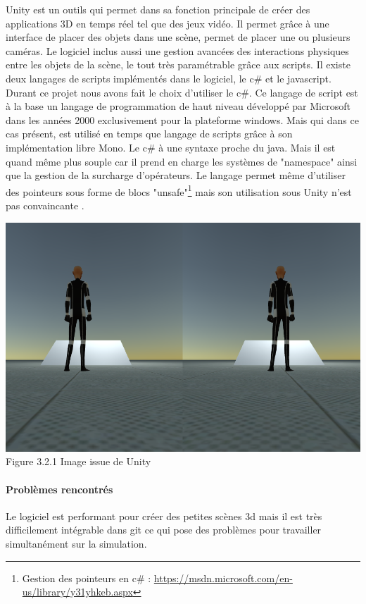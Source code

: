 \documentclass[12pt,a4paper]{report}
\begin{document}
Unity est un outils qui permet dans sa fonction principale de créer des applications 3D en temps réel tel que des jeux vidéo. Il permet grâce à une interface de placer des objets dans une scène, permet de placer une ou plusieurs caméras. Le logiciel inclus aussi une gestion avancées des interactions physiques entre les objets de la scène, le tout très paramétrable grâce aux scripts. Il existe deux langages de scripts implémentés dans le logiciel, le c\# et le javascript. Durant ce projet nous avons fait le choix d'utiliser le c\#.
Ce langage de script est à la base un langage de programmation de haut niveau développé par Microsoft dans les années 2000 exclusivement pour la plateforme windows. Mais qui dans ce cas présent, est utilisé en temps que langage de scripts grâce à son implémentation libre Mono. Le c\# à une syntaxe proche du java. Mais il est quand même plus souple car il prend en charge les systèmes de "namespace" ainsi que la gestion de la surcharge d'opérateurs. Le langage permet même d'utiliser des pointeurs sous forme de blocs "unsafe"\footnote{Gestion des pointeurs en c\# : \url{https://msdn.microsoft.com/en-us/library/y31yhkeb.aspx}} mais son utilisation sous Unity n'est pas convaincante .

	\begin{center}
		\includegraphics[scale=0.5]{Screenshot_skybox.png}
		Figure 3.2.1 Image issue de Unity\\
	\end{center}
 	
\paragraph{Problèmes rencontrés}
Le logiciel est performant pour créer des petites scènes 3d mais il est très difficilement intégrable dans git ce qui pose des problèmes pour travailler simultanément sur la simulation.
\end{document}
